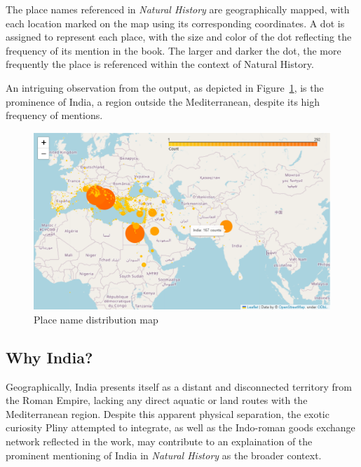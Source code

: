 \documentclass[
  12pt,
]{article}
\begin{document}
The place names referenced in \emph{Natural History} are geographically
mapped, with each location marked on the map using its corresponding
coordinates. A dot is assigned to represent each place, with the size
and color of the dot reflecting the frequency of its mention in the
book. The larger and darker the dot, the more frequently the place is
referenced within the context of Natural History.

An intriguing observation from the output, as depicted in
Figure~\ref{fig-geonamemap_pdf}, is the prominence of India, a region
outside the Mediterranean, despite its high frequency of mentions.

\begin{figure}[H]

{\centering \includegraphics{NHthesis_0728_files/figure-pdf/fig-geonamemap_pdf-output-1.png}

}

\caption{\label{fig-geonamemap_pdf}Place name distribution map}

\end{figure}

\hypertarget{why-india}{%
\subsection{Why India?}\label{why-india}}

Geographically, India presents itself as a distant and disconnected
territory from the Roman Empire, lacking any direct aquatic or land
routes with the Mediterranean region. Despite this apparent physical
separation, the exotic curiosity Pliny attempted to integrate, as well
as the Indo-roman goods exchange network reflected in the work, may
contribute to an explaination of the prominent mentioning of India in
\emph{Natural History} as the broader context.
\end{document}
